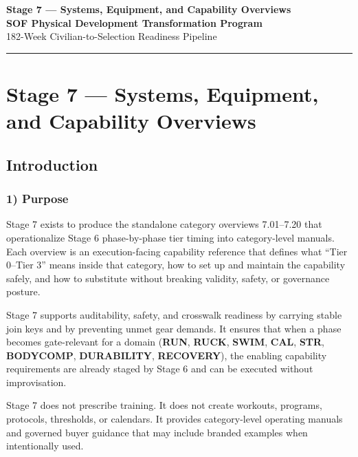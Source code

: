 \documentclass[10pt]{article}
\newcommand{\TitleLine}{\textcolor{StageBlue}{\rule{0.98\linewidth}{0.95pt}}}
\begin{document}
\begin{tcolorbox}
\begin{center}
{\LARGE\bfseries Stage 7 — Systems, Equipment, and Capability Overviews}\\[0.35em]
{\Large\bfseries SOF Physical Development Transformation Program}\\[0.25em]
{\large 182-Week Civilian-to-Selection Readiness Pipeline}\\[0.65em]
\TitleLine
\end{center}
\end{tcolorbox}

\vspace{0.35em}

\section*{Stage 7 — Systems, Equipment, and Capability Overviews}
{}

\subsection*{Introduction}
{}

\subsubsection*{1) Purpose}

Stage 7 exists to produce the standalone category overviews 7.01–7.20 that operationalize Stage 6 phase-by-phase tier timing into category-level manuals. Each overview is an execution-facing capability reference that defines what “Tier 0–Tier 3” means inside that category, how to set up and maintain the capability safely, and how to substitute without breaking validity, safety, or governance posture.

Stage 7 supports auditability, safety, and crosswalk readiness by carrying stable join keys and by preventing unmet gear demands. It ensures that when a phase becomes gate-relevant for a domain (\textbf{RUN}, \textbf{RUCK}, \textbf{SWIM}, \textbf{CAL}, \textbf{STR}, \textbf{BODYCOMP}, \textbf{DURABILITY}, \textbf{RECOVERY}), the enabling capability requirements are already staged by Stage 6 and can be executed without improvisation.

Stage 7 does not prescribe training. It does not create workouts, programs, protocols, thresholds, or calendars. It provides category-level operating manuals and governed buyer guidance that may include branded examples when intentionally used.
\end{document}
